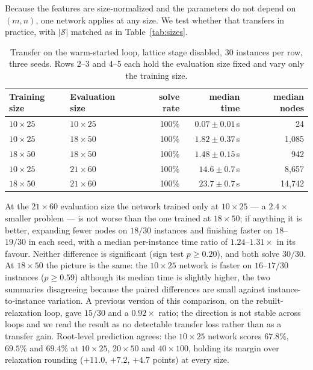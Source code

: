 \documentclass[preprint,12pt]{elsarticle}
\newcommand{\SOL}{\mathcal{S}}
\begin{document}
Because the features are size-normalized and the parameters do not depend on $(m,n)$, one network applies at any size. We test whether that transfers in practice, with $|\SOL|$ matched as in Table~\ref{tab:sizes}.

\begin{table}[h]
\centering
\begin{tabular}{llrrr}
\toprule
Training size & Evaluation size & solve rate & median time & median nodes \\
\midrule
$10\times25$ & $10\times25$ & 100\% & $0.07\pm0.01$\,s & 24 \\
$10\times25$ & $18\times50$ & 100\% & $1.82\pm0.37$\,s & 1{,}085 \\
$18\times50$ & $18\times50$ & 100\% & $1.48\pm0.15$\,s & 942 \\
$10\times25$ & $21\times60$ & 100\% & $14.6\pm0.7$\,s & 8{,}657 \\
$18\times50$ & $21\times60$ & 100\% & $23.7\pm0.7$\,s & 14{,}742 \\
\bottomrule
\end{tabular}
\caption{Transfer on the warm-started loop, lattice stage disabled, $30$ instances per row, three seeds. Rows 2--3 and 4--5 each hold the evaluation size fixed and vary only the training size.}
\label{tab:transfer}
\end{table}

At the $21\times60$ evaluation size the network trained only at $10\times25$ --- a $2.4\times$ smaller problem --- is not worse than the one trained at $18\times50$; if anything it is better, expanding fewer nodes on $18/30$ instances and finishing faster on $18$--$19/30$ in each seed, with a median per-instance time ratio of $1.24$--$1.31\times$ in its favour. Neither difference is significant (sign test $p\ge0.20$), and both solve $30/30$. At $18\times50$ the picture is the same: the $10\times25$ network is faster on $16$--$17/30$ instances ($p\ge0.59$) although its median time is slightly higher, the two summaries disagreeing because the paired differences are small against instance-to-instance variation. A previous version of this comparison, on the rebuilt-relaxation loop, gave $15/30$ and a $0.92\times$ ratio; the direction is not stable across loops and we read the result as no detectable transfer loss rather than as a transfer gain. Root-level prediction agrees: the $10\times25$ network scores $67.8\%$, $69.5\%$ and $69.4\%$ at $10\times25$, $20\times50$ and $40\times100$, holding its margin over relaxation rounding ($+11.0$, $+7.2$, $+4.7$ points) at every size.
\end{document}
